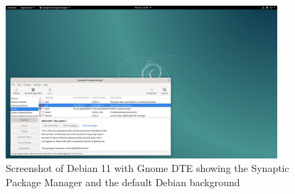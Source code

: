 %

\begin{figure}[!h]
  \centering
   \includegraphics[width=0.9\textwidth]{debiangnome.png}
  \caption{Screenshot of Debian 11 with Gnome DTE  showing the Synaptic Package Manager and the default Debian background}
  \label{fig:debiangnome}
\end{figure}

%

